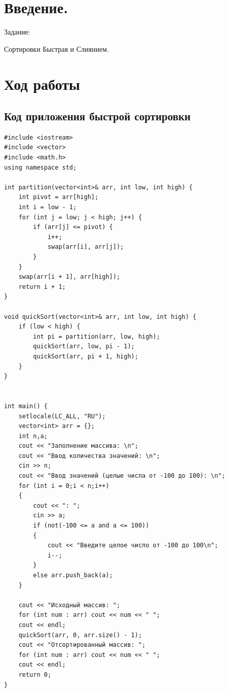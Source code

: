 \documentclass[12pt,a4paper]{scrartcl}
\begin{document}
\section{Введение.}
\label{sec:intro}
Задание:
\begin{description}
    Сортировки Быстрая и Слиянием.
\end{description}
\section{Ход работы}
\label{sec:exp}
\subsection{Код приложения быстрой сортировки}
\label{sec:exp:code}
\begin{verbatim}
#include <iostream>
#include <vector>
#include <math.h>
using namespace std;

int partition(vector<int>& arr, int low, int high) {
    int pivot = arr[high];
    int i = low - 1;
    for (int j = low; j < high; j++) {
        if (arr[j] <= pivot) {
            i++;
            swap(arr[i], arr[j]);
        }
    }
    swap(arr[i + 1], arr[high]);
    return i + 1;
}

void quickSort(vector<int>& arr, int low, int high) {
    if (low < high) {
        int pi = partition(arr, low, high);
        quickSort(arr, low, pi - 1);
        quickSort(arr, pi + 1, high);
    }
}


int main() {
    setlocale(LC_ALL, "RU");
    vector<int> arr = {};
    int n,a;
    cout << "Заполнение массива: \n";
    cout << "Ввод количества значений: \n";
    cin >> n;
    cout << "Ввод значений (целые числа от -100 до 100): \n";
    for (int i = 0;i < n;i++)
    {
        cout << ": ";
        cin >> a;
        if (not(-100 <= a and a <= 100))
        {
            cout << "Введите целое число от -100 до 100\n";
            i--;
        }
        else arr.push_back(a);
    }

    cout << "Исходный массив: ";
    for (int num : arr) cout << num << " ";
    cout << endl;
    quickSort(arr, 0, arr.size() - 1);
    cout << "Отсортированный массив: ";
    for (int num : arr) cout << num << " ";
    cout << endl;
    return 0;
}
\end{verbatim}
\end{document}
